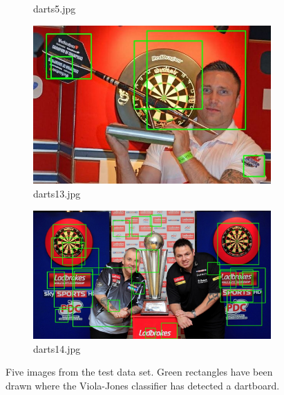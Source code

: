 \documentclass[conference]{IEEEtran}
\begin{document}
\begin{figure}[htb]
\begin{subfigure}{.5\linewidth}
  \caption{darts5.jpg}
  \label{fig:sub2}
\end{subfigure}
\begin{subfigure}{.5\linewidth}
  \centering
  \includegraphics[width=.9\linewidth]{images/task2/detected13.jpg}
  \caption{darts13.jpg}
  \label{fig:sub1}
\end{subfigure}%
\begin{subfigure}{.5\linewidth}
  \centering
  \includegraphics[width=.9\linewidth]{images/task2/detected14.jpg}
  \caption{darts14.jpg}
  \label{fig:sub2}
\end{subfigure}
\caption{Five images from the test data set. Green rectangles have been drawn where the Viola-Jones classifier has detected a dartboard.}
\end{figure}
\par

\newpage
\end{document}
